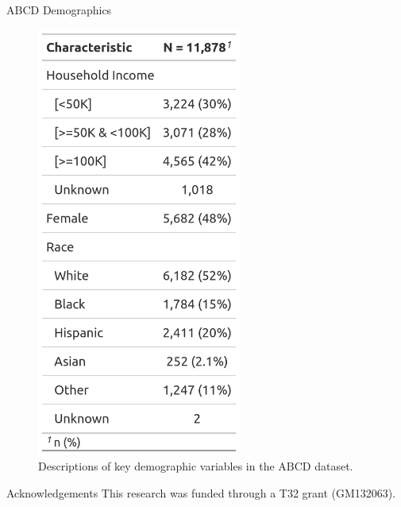 \documentclass[final]{beamer}
\newlength{\onecolwid}
\begin{document}
\begin{frame}[t]
\begin{columns}[t]
\begin{column}{\onecolwid}
\begin{block}{ABCD Demographics}
\begin{figure}
    \centering
    \includegraphics[width = 0.6\textwidth]{Graphics/Table1.png}
    \caption{Descriptions of key demographic variables in the ABCD dataset.
}
    \label{tab:table}
\end{figure}
\end{block}



%
%

\begin{block}{Acknowledgements}
This research was funded through a T32 grant (GM132063).
\end{block}


\end{column}
\end{columns}
\end{frame}
\end{document}
